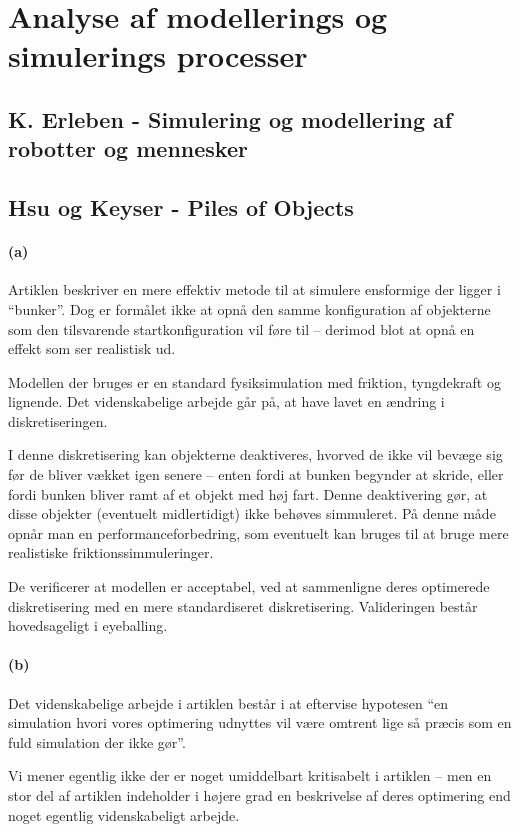 \section{Analyse af modellerings og simulerings processer}

\subsection{K. Erleben - Simulering og modellering af robotter og mennesker}

\subsection{Hsu og Keyser - Piles of Objects}
\paragraph{(a)}
Artiklen beskriver en mere effektiv metode til at simulere ensformige der ligger
i ``bunker''. Dog er formålet ikke at opnå den samme konfiguration af objekterne
som den tilsvarende startkonfiguration vil føre til -- derimod blot at opnå en
effekt som ser realistisk ud.

Modellen der bruges er en standard fysiksimulation med friktion, tyngdekraft og
lignende. Det videnskabelige arbejde går på, at have lavet en ændring i
diskretiseringen.

I denne diskretisering kan objekterne deaktiveres, hvorved de
ikke vil bevæge sig før de bliver vækket igen senere -- enten fordi at bunken
begynder at skride, eller fordi bunken bliver ramt af et objekt med høj fart.
Denne deaktivering gør, at disse objekter (eventuelt midlertidigt) ikke behøves
simmuleret. På denne måde opnår man en performanceforbedring, som eventuelt kan
bruges til at bruge mere realistiske friktionssimmuleringer.

De verificerer at modellen er acceptabel, ved at sammenligne deres optimerede
diskretisering med en mere standardiseret diskretisering. Valideringen består
hovedsageligt i eyeballing.

\paragraph{(b)}
Det videnskabelige arbejde i artiklen består i at eftervise hypotesen ``en
simulation hvori vores optimering udnyttes vil være omtrent lige så præcis som
en fuld simulation der ikke gør''.

Vi mener egentlig ikke der er noget umiddelbart kritisabelt i artiklen -- men en
stor del af artiklen indeholder i højere grad en beskrivelse af deres optimering
end noget egentlig videnskabeligt arbejde.
